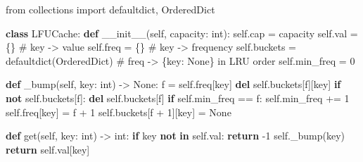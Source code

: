 \documentclass[11pt]{article}
\newenvironment{Shaded}{\begin{snugshade}}{\end{snugshade}}
\newcommand{\BuiltInTok}[1]{\textcolor[rgb]{0.50,0.55,0.55}{#1}}
\newcommand{\CommentTok}[1]{\textcolor[rgb]{0.48,0.49,0.49}{#1}}
\newcommand{\ControlFlowTok}[1]{\textcolor[rgb]{0.99,0.74,0.29}{\textbf{#1}}}
\newcommand{\DecValTok}[1]{\textcolor[rgb]{0.96,0.45,0.00}{#1}}
\newcommand{\FunctionTok}[1]{\textcolor[rgb]{0.56,0.27,0.68}{#1}}
\newcommand{\ImportTok}[1]{\textcolor[rgb]{0.15,0.68,0.38}{#1}}
\newcommand{\KeywordTok}[1]{\textcolor[rgb]{0.81,0.81,0.76}{\textbf{#1}}}
\newcommand{\NormalTok}[1]{\textcolor[rgb]{0.81,0.81,0.76}{#1}}
\newcommand{\OperatorTok}[1]{\textcolor[rgb]{0.81,0.81,0.76}{#1}}
\newcommand{\VariableTok}[1]{\textcolor[rgb]{0.15,0.68,0.68}{#1}}
\begin{document}
\begin{Shaded}
\begin{Highlighting}[]
\ImportTok{from}\NormalTok{ collections }\ImportTok{import}\NormalTok{ defaultdict, OrderedDict}

\KeywordTok{class}\NormalTok{ LFUCache:}
    \KeywordTok{def} \FunctionTok{\_\_init\_\_}\NormalTok{(}\VariableTok{self}\NormalTok{, capacity: }\BuiltInTok{int}\NormalTok{):}
        \VariableTok{self}\NormalTok{.cap }\OperatorTok{=}\NormalTok{ capacity}
        \VariableTok{self}\NormalTok{.val }\OperatorTok{=}\NormalTok{ \{\}                       }\CommentTok{\# key {-}\textgreater{} value}
        \VariableTok{self}\NormalTok{.freq }\OperatorTok{=}\NormalTok{ \{\}                      }\CommentTok{\# key {-}\textgreater{} frequency}
        \VariableTok{self}\NormalTok{.buckets }\OperatorTok{=}\NormalTok{ defaultdict(OrderedDict)  }\CommentTok{\# freq {-}\textgreater{} \{key: None\} in LRU order}
        \VariableTok{self}\NormalTok{.min\_freq }\OperatorTok{=} \DecValTok{0}

    \KeywordTok{def}\NormalTok{ \_bump(}\VariableTok{self}\NormalTok{, key: }\BuiltInTok{int}\NormalTok{) }\OperatorTok{{-}\textgreater{}} \VariableTok{None}\NormalTok{:}
\NormalTok{        f }\OperatorTok{=} \VariableTok{self}\NormalTok{.freq[key]}
        \KeywordTok{del} \VariableTok{self}\NormalTok{.buckets[f][key]}
        \ControlFlowTok{if} \KeywordTok{not} \VariableTok{self}\NormalTok{.buckets[f]:}
            \KeywordTok{del} \VariableTok{self}\NormalTok{.buckets[f]}
            \ControlFlowTok{if} \VariableTok{self}\NormalTok{.min\_freq }\OperatorTok{==}\NormalTok{ f:}
                \VariableTok{self}\NormalTok{.min\_freq }\OperatorTok{+=} \DecValTok{1}
        \VariableTok{self}\NormalTok{.freq[key] }\OperatorTok{=}\NormalTok{ f }\OperatorTok{+} \DecValTok{1}
        \VariableTok{self}\NormalTok{.buckets[f }\OperatorTok{+} \DecValTok{1}\NormalTok{][key] }\OperatorTok{=} \VariableTok{None}

    \KeywordTok{def}\NormalTok{ get(}\VariableTok{self}\NormalTok{, key: }\BuiltInTok{int}\NormalTok{) }\OperatorTok{{-}\textgreater{}} \BuiltInTok{int}\NormalTok{:}
        \ControlFlowTok{if}\NormalTok{ key }\KeywordTok{not} \KeywordTok{in} \VariableTok{self}\NormalTok{.val:}
            \ControlFlowTok{return} \OperatorTok{{-}}\DecValTok{1}
        \VariableTok{self}\NormalTok{.\_bump(key)}
        \ControlFlowTok{return} \VariableTok{self}\NormalTok{.val[key]}


\end{Highlighting}
\end{Shaded}
\end{document}
